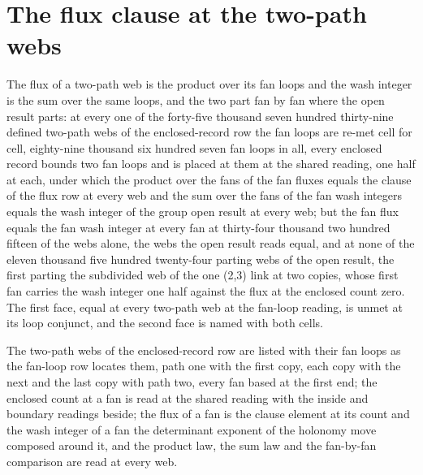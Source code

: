 \section{The flux clause at the two-path webs}\label{mod:I-5-D541411-w-flxc}
\begin{chwall}\label{box:I-5-D541411-w-flxc:1}
The flux of a two-path web is the product over its fan loops and the wash integer is the sum over the same loops, and the two part fan by fan where the open result parts: at every one of the forty-five thousand seven hundred thirty-nine defined two-path webs of the enclosed-record row the fan loops are re-met cell for cell, eighty-nine thousand six hundred seven fan loops in all, every enclosed record bounds two fan loops and is placed at them at the shared reading, one half at each, under which the product over the fans of the fan fluxes equals the clause of the flux row at every web and the sum over the fans of the fan wash integers equals the wash integer of the group open result at every web; but the fan flux equals the fan wash integer at every fan at thirty-four thousand two hundred fifteen of the webs alone, the webs the open result reads equal, and at none of the eleven thousand five hundred twenty-four parting webs of the open result, the first parting the subdivided web of the one (2,3) link at two copies, whose first fan carries the wash integer one half against the flux at the enclosed count zero. The first face, equal at every two-path web at the fan-loop reading, is unmet at its loop conjunct, and the second face is named with both cells.
\end{chwall}
The two-path webs of the enclosed-record row are listed with their fan loops as the fan-loop row locates them, path one with the first copy, each copy with the next and the last copy with path two, every fan based at the first end; the enclosed count at a fan is read at the shared reading with the inside and boundary readings beside; the flux of a fan is the clause element at its count and the wash integer of a fan the determinant exponent of the holonomy move composed around it, and the product law, the sum law and the fan-by-fan comparison are read at every web.

